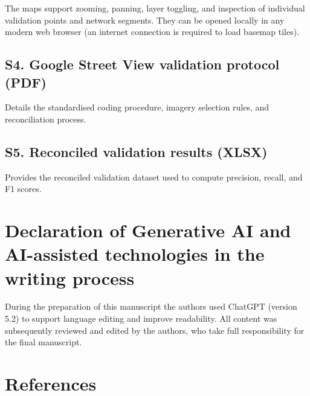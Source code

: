 \documentclass[
]{article}
\begin{document}
The maps support zooming, panning, layer toggling, and inspection of
individual validation points and network segments. They can be opened
locally in any modern web browser (an internet connection is required to
load basemap tiles).

\subsection*{S4. Google Street View validation protocol
(PDF)}\label{s4-gsv-protocol}

Details the standardised coding procedure, imagery selection rules, and
reconciliation process.

\subsection*{S5. Reconciled validation results
(XLSX)}\label{s5-joined-results}

Provides the reconciled validation dataset used to compute precision,
recall, and F1 scores.

\section*{Declaration of Generative AI and AI-assisted technologies in
the writing
process}\label{declaration-of-generative-ai-and-ai-assisted-technologies-in-the-writing-process}

During the preparation of this manuscript the authors used ChatGPT
(version 5.2) to support language editing and improve readability. All
content was subsequently reviewed and edited by the authors, who take
full responsibility for the final manuscript.

\section*{References}\label{references}
\end{document}
